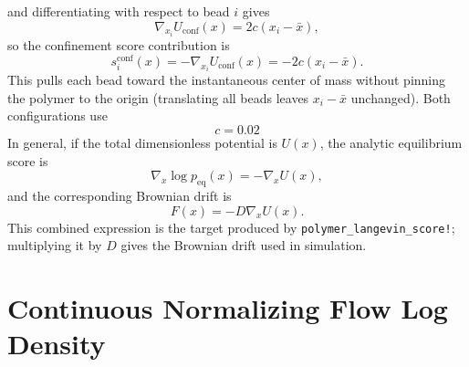 \documentclass[reprint,amsmath,amssymb,aps,pra,10pt]{revtex4-2}
\begin{document}
and differentiating with respect to bead $i$ gives
\begin{equation}
    \nabla_{x_i}U_{\mathrm{conf}}(x)
    =
    2c(x_i-\bar{x}),
\end{equation}
so the confinement score contribution is
\begin{equation}
    s^{\mathrm{conf}}_i(x)
    =
    -\nabla_{x_i}U_{\mathrm{conf}}(x)
    =
    -2c(x_i-\bar{x}).
\end{equation}
This pulls each bead toward the instantaneous center of mass without pinning the polymer to the origin (translating all beads leaves $x_i-\bar{x}$ unchanged).
Both configurations use
\begin{equation}
    c=0.02
\end{equation}
In general, if the total dimensionless potential is $U(x)$, the analytic equilibrium score is
\begin{equation}
    \nabla_x\log p_{\mathrm{eq}}(x)
    =
    -\nabla_x U(x),
\end{equation}
and the corresponding Brownian drift is
\begin{equation}
    F(x)
    =
    -D\nabla_x U(x).
\end{equation}
This combined expression is the target produced by \texttt{polymer\_langevin\_score!}; multiplying it by $D$ gives the Brownian drift used in simulation.

\section{Continuous Normalizing Flow Log Density}
\end{document}
